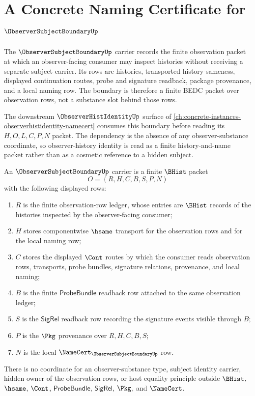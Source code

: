 \chapter{A Concrete Naming Certificate for $\ObserverSubjectBoundaryUp$}
\label{ch:concrete-instances-observersubjectboundary-namecert}

The $\ObserverSubjectBoundaryUp$ carrier records the finite observation packet at which an observer-facing consumer may inspect histories without receiving a separate subject carrier. Its rows are histories, transported history-sameness, displayed continuation routes, probe and signature readback, package provenance, and a local naming row. The boundary is therefore a finite BEDC packet over observation rows, not a substance slot behind those rows.

The downstream $\ObserverHistIdentityUp$ surface of \autoref{ch:concrete-instances-observerhistidentity-namecert} consumes this boundary before reading its $H,O,L,C,P,N$ packet. The dependency is the absence of any observer-substance coordinate, so observer-history identity is read as a finite history-and-name packet rather than as a cosmetic reference to a hidden subject.

\begin{definition}
\label{def:observer-subject-boundary-carrier}
An $\ObserverSubjectBoundaryUp$ carrier is a finite $\BHist$ packet
$$
O=(R,H,C,B,S,P,N)
$$
with the following displayed rows:
\begin{enumerate}
\item $R$ is the finite observation-row ledger, whose entries are $\BHist$ records of the histories inspected by the observer-facing consumer;
\item $H$ stores componentwise $\hsame$ transport for the observation rows and for the local naming row;
\item $C$ stores the displayed $\Cont$ routes by which the consumer reads observation rows, transports, probe bundles, signature relations, provenance, and local naming;
\item $B$ is the finite $\mathsf{ProbeBundle}$ readback row attached to the same observation ledger;
\item $S$ is the $\mathsf{SigRel}$ readback row recording the signature events visible through $B$;
\item $P$ is the $\Pkg$ provenance over $R,H,C,B,S$;
\item $N$ is the local $\NameCert_{\ObserverSubjectBoundaryUp}$ row.
\end{enumerate}
There is no coordinate for an observer-substance type, subject identity carrier, hidden owner of the observation rows, or host equality principle outside $\BHist$, $\hsame$, $\Cont$, $\mathsf{ProbeBundle}$, $\mathsf{SigRel}$, $\Pkg$, and $\NameCert$.
\end{definition}

